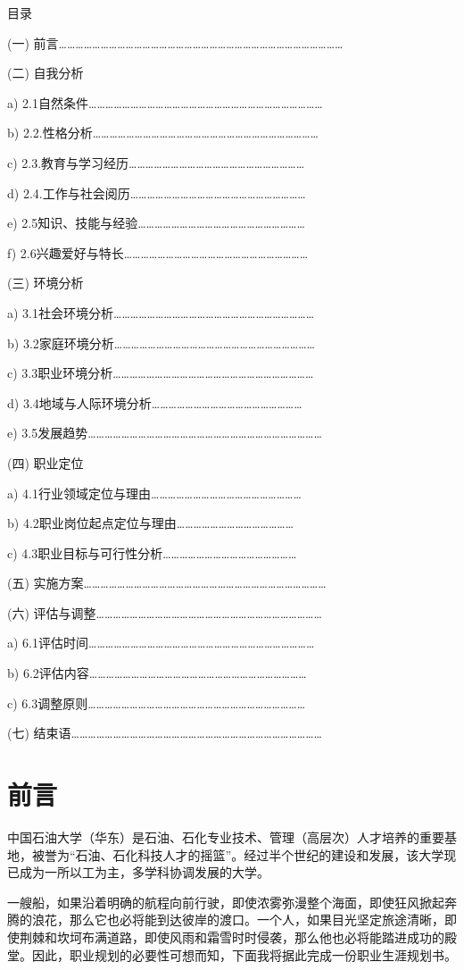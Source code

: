 \documentclass{article}
\begin{document}
\thispagestyle{empty}
\newpage
\setcounter{page}{1}
      {目录}\par
	(一)	前言…………………………………………………………………………………………\par
	(二)	自我分析\par	
	a)	2.1自然条件…………………………………………………………………………\par
	b)	2.2.性格分析………………………………………………………………………\par
	c)  2.3.教育与学习经历………………………………………………………\par	
	d)	2.4.工作与社会阅历………………………………………………………\par
	e)  2.5知识、技能与经验……………………………………………………\par
	f)  2.6兴趣爱好与特长…………………………………………………………\par
	(三)	环境分析\par
	a)  3.1社会环境分析………………………………………………………………\par
	b)	3.2家庭环境分析………………………………………………………………\par
	c)	3.3职业环境分析………………………………………………………………\par
	d)	3.4地域与人际环境分析………………………………………………\par
	e)  3.5发展趋势…………………………………………………………………………\par
	(四)	职业定位\par	
	a)  4.1行业领域定位与理由………………………………………………\par
	b)  4.2职业岗位起点定位与理由……………………………………\par
	c)  4.3职业目标与可行性分析…………………………………………\par
	(五) 实施方案……………………………………………………………………………\par
	(六) 评估与调整………………………………………………………………………\par
	a)  6.1评估时间………………………………………………………………………\par
	b)  6.2评估内容……………………………………………………………………\par
	c)  6.3调整原则……………………………………………………………………\par	
	(七)	结束语………………………………………………………………………………\par
\section{前言}\par	
中国石油大学（华东）是石油、石化专业技术、管理（高层次）人才培养的重要基地，被誉为“石油、石化科技人才的摇篮”。经过半个世纪的建设和发展，该大学现已成为一所以工为主，多学科协调发展的大学。\par
一艘船，如果沿着明确的航程向前行驶，即使浓雾弥漫整个海面，即使狂风掀起奔腾的浪花，那么它也必将能到达彼岸的渡口。一个人，如果目光坚定旅途清晰，即使荆棘和坎坷布满道路，即使风雨和霜雪时时侵袭，那么他也必将能踏进成功的殿堂。因此，职业规划的必要性可想而知，下面我将据此完成一份职业生涯规划书。\par
\end{document}
